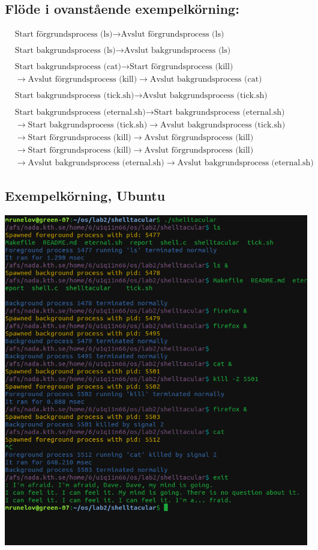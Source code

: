 \documentclass[paper=a4, fontsize=11pt]{scrartcl} %
\numberwithin{equation}{section} %
\numberwithin{figure}{section} %
\numberwithin{table}{section} %
\begin{document}
\subsection*{Flöde i ovanstående exempelkörning:}
\begin{align*}
&\text{Start förgrundsprocess (ls)} \rightarrow \text{Avslut förgrundsprocess (ls)} 
\\\\&\text{Start bakgrundsprocess (ls)} \rightarrow \text{Avslut bakgrundsprocess (ls)} 
\\\\&\text{Start bakgrundsprocess (cat)} \rightarrow \text{Start förgrundsprocess (kill)} 
\\& \rightarrow \text{Avslut förgrundsprocess (kill)} \rightarrow \text{Avslut bakgrundsprocess (cat)}
\\\\&\text{Start bakgrundsprocess (tick.sh)} \rightarrow \text{Avslut bakgrundsprocess (tick.sh)}  
\\\\&\text{Start bakgrundsprocess (eternal.sh)} \rightarrow \text{Start bakgrundsprocess (eternal.sh)} 
\\&\rightarrow \text{Start bakgrundsprocess (tick.sh)} \rightarrow \text{Avslut bakgrundsprocess (tick.sh)} 
\\&\rightarrow\text{Start förgrundsprocess (kill)} \rightarrow \text{Avslut förgrundsprocess (kill)} 
\\&\rightarrow\text{Start förgrundsprocess (kill)} \rightarrow \text{Avslut förgrundsprocess (kill)} 
\\&\rightarrow\text{Avslut bakgrundsprocess (eternal.sh)} \rightarrow \text{Avslut bakgrundsprocess (eternal.sh)} 
\end{align*}

\newpage
\subsection*{Exempelkörning, Ubuntu}
\centerline{\includegraphics[scale=0.8]{"shelltacular"}}

\end{document}
